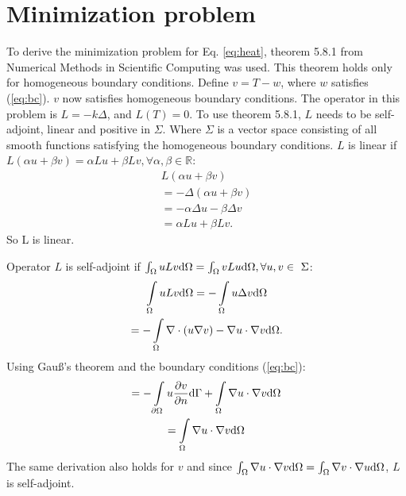 \section{Minimization problem}
To derive the minimization problem for Eq. \ref{eq:heat}, theorem 5.8.1 from Numerical Methods in Scientific Computing \cite{kan} was used. This theorem holds only for homogeneous boundary conditions. Define $v=T-w$, where $w$ satisfies (\ref{eq:bc}). $v$ now satisfies homogeneous boundary conditions. The operator in this problem is $L=-k\Delta$, and $L(T)=0$. To use theorem 5.8.1, $L$ needs to be self-adjoint, linear and positive in $\Sigma$. Where $\Sigma$ is a vector space consisting of all smooth functions satisfying the homogeneous boundary conditions. $L$ is linear if $L(\alpha u+\beta v)=\alpha Lu+\beta Lv, \forall\alpha,\beta\in\mathbb{R}$:
\begin{gather*}
    L(\alpha u+\beta v)\\
    =-\Delta(\alpha u + \beta v)\\
    =-\alpha\Delta u-\beta \Delta v\\
    = \alpha Lu+\beta Lv.
\end{gather*}So L is linear.

Operator $L$ is self-adjoint if $\int\displaylimits_\Omega uLv \mathrm{d}\Omega=\int\displaylimits_\Omega vLu \mathrm{d}\Omega, \forall u,v\in~\Sigma$:
\begin{gather*}
    \int\displaylimits_\Omega uLv \mathrm{d}\Omega = -\int\displaylimits_\Omega u\Delta v \mathrm{d}\Omega\\
    =-\int\displaylimits_\Omega \nabla \cdot (u\nabla v) - \nabla u\cdot\nabla v \mathrm{d}\Omega.
\end{gather*}
Using Gau\ss's theorem and the boundary conditions (\ref{eq:bc}):
\begin{gather*}
    =-\int\displaylimits_{\partial\Omega} u\frac{\partial v}{\partial n} \mathrm{d}\Gamma + \int\displaylimits_\Omega \nabla u\cdot\nabla v \mathrm{d}\Omega\\
    =\int\displaylimits_\Omega \nabla u\cdot \nabla v\mathrm{d}\Omega
\end{gather*}
The same derivation also holds for $v$ and since $\int\displaylimits_\Omega \nabla u\cdot \nabla v \mathrm{d}\Omega = \int\displaylimits_\Omega \nabla v\cdot \nabla u \mathrm{d}\Omega$, $L$ is self-adjoint.

